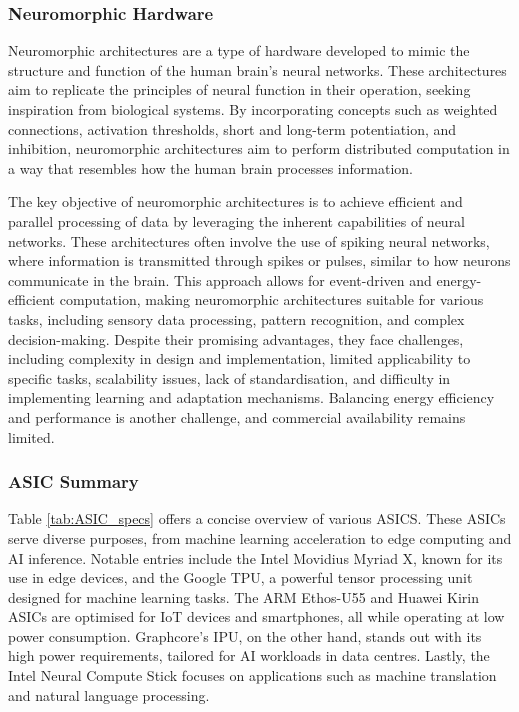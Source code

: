 \subsubsection{Neuromorphic Hardware}
 Neuromorphic architectures are a type of hardware developed to mimic the structure and function of the human brain's neural networks. These architectures aim to replicate the principles of neural function in their operation, seeking inspiration from biological systems. By incorporating concepts such as weighted connections, activation thresholds, short and long-term potentiation, and inhibition, neuromorphic architectures aim to perform distributed computation in a way that resembles how the human brain processes information.

The key objective of neuromorphic architectures is to achieve efficient and parallel processing of data by leveraging the inherent capabilities of neural networks. These architectures often involve the use of spiking neural networks, where information is transmitted through spikes or pulses, similar to how neurons communicate in the brain. This approach allows for event-driven and energy-efficient computation, making neuromorphic architectures suitable for various tasks, including sensory data processing, pattern recognition, and complex decision-making. Despite their promising advantages, they face challenges, including complexity in design and implementation, limited applicability to specific tasks, scalability issues, lack of standardisation, and difficulty in implementing learning and adaptation mechanisms. Balancing energy efficiency and performance is another challenge, and commercial availability remains limited. 


\subsubsection{ASIC Summary}


Table \ref{tab:ASIC_specs} offers a concise overview of various ASICS. These ASICs serve diverse purposes, from machine learning acceleration to edge computing and AI inference. Notable entries include the Intel Movidius Myriad X, known for its use in edge devices, and the Google TPU, a powerful tensor processing unit designed for machine learning tasks. The ARM Ethos-U55 and Huawei Kirin ASICs are optimised for IoT devices and smartphones, all while operating at low power consumption. Graphcore's IPU, on the other hand, stands out with its high power requirements, tailored for AI workloads in data centres. Lastly, the Intel Neural Compute Stick focuses on applications such as machine translation and natural language processing.

